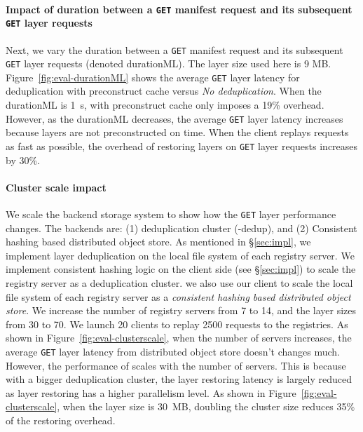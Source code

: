 \paragraph{Impact of duration between a \texttt{GET} manifest request and its subsequent \texttt{GET} layer requests}
Next, we vary the duration between a \texttt{GET} manifest request and its subsequent \texttt{GET} layer requests (denoted durationML).
The layer size used here is 9 MB.
%
Figure~\ref{fig:eval-durationML} shows the average \texttt{GET} layer latency for \sysname deduplication with preconstruct cache versus \emph{No deduplication}.
When the durationML is 1~s, \sysname with preconstruct cache only imposes a 19\% overhead.
However, as the durationML decreases, the average \texttt{GET} layer latency increases because layers are not preconstructed on time.
When the client replays requests as fast as possible, the overhead of restoring layers on \texttt{GET} layer requests increases by 30\%.


\paragraph{Cluster scale impact}
We scale the backend storage system to show how the \texttt{GET} layer performance changes. 
The backends are:
 (1) \sysname deduplication cluster (\sysname-dedup),
 and
 (2) Consistent hashing based distributed object store. 
 As mentioned in \S\ref{sec:impl},
 we implement layer deduplication on the
 local file system of each registry server.
We implement consistent hashing logic on the client side (see \S\ref{sec:impl}) to scale the registry server as a deduplication cluster.
we also use our client to scale the local file system of each registry server as a \emph{consistent hashing based distributed object store}.
We increase the number of registry servers from 7 to 14,
and the layer sizes from 30 to 70.
We launch 20 clients to replay 2500 requests to the registries.
%
As shown in Figure~\ref{fig:eval-clusterscale}, when the number of servers increases, the average \texttt{GET} layer latency from distributed object store doesn't changes much.
However, the performance of \sysname scales with the number of servers.
This is because with a bigger deduplication cluster, the layer restoring latency is largely reduced as layer restoring has a higher parallelism level. 
As shown in Figure~\ref{fig:eval-clusterscale}, when the layer size is 30~MB, doubling the cluster size reduces 35\% of the restoring overhead.

